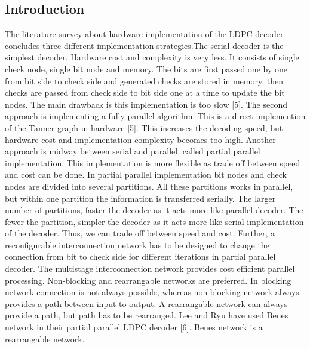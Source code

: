 \documentclass[twopage,12pt,a4paper]{report}
\begin{document}
\begin{raggedright}
\section{Introduction}
The literature survey about hardware implementation of the LDPC decoder concludes three different implementation strategies.The serial decoder is the simplest decoder. Hardware cost and complexity is very less. It consists of single check node, single bit node and memory. The bits are first passed one by one from bit side to check side and generated checks are stored in memory, then checks are passed from check side to bit side one at a time to update the bit nodes. The main drawback is this implementation is too slow [5]. The second approach is implementing a fully parallel algorithm. This is a direct implemention of the Tanner graph in hardware [5]. This increases the decoding speed, but hardware cost and implementation complexity becomes too high. Another approach is midway between serial and parallel, called partial parallel implementation. This implementation is more flexible as trade off between speed and cost can be done. In partial parallel implementation bit nodes and check nodes are divided into several partitions. All these partitions works in parallel, but within one partition the information is transferred serially. The larger number of partitions, faster the decoder as it acts more like parallel decoder. The fewer the partition, simpler the decoder as it acts more like serial implementation of the decoder. Thus, we can trade off between speed and cost. Further, a reconfigurable interconnection network has to be designed to change the connection from bit to check side for different iterations in partial parallel decoder. The multistage interconnection network provides cost efficient parallel processing. Non-blocking and rearrangable networks are preferred. In blocking network connection is not always possible, whereas non-blocking network always provides a path between input to output. A rearrangable network can always provide a path, but path has to be rearranged. Lee and Ryu have used Benes network in their partial parallel LDPC decoder [6]. Benes network is a rearrangable network.


\end{raggedright}
\end{document}

